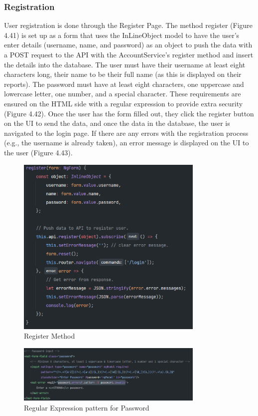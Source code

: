 \subsubsection{Registration}
User registration is done through the Register Page. The method register (Figure 4.41) is set up as a form that uses the InLineObject model to have the user's enter details (username, name, and password) as an object to push the data with a POST request to the API with the AccountService's register method and insert the details into the database. The user must have their username at least eight characters long, their name to be their full name (as this is displayed on their reports). The password must have at least eight characters, one uppercase and lowercase letter, one number, and a special character. These requirements are ensured on the HTML side with a regular expression to provide extra security (Figure 4.42). Once the user has the form filled out, they click the register button on the UI to send the data, and once the data in the database, the user is navigated to the login page. If there are any errors with the registration process (e.g., the username is already taken), an error message is displayed on the UI to the user (Figure 4.43).

\begin{figure}[H]
    \caption{Register Method}
    \label{image:registerMethod}
    \centering
    \includegraphics[width=0.8\textwidth]{images/repota/account_pages/register.png}
\end{figure}

\begin{figure}[H]
    \caption{Regular Expression pattern for Password}
    \label{image:passwordRegEx}
    \centering
    \includegraphics[width=0.8\textwidth]{images/repota/account_pages/password_regex.png}
\end{figure}


